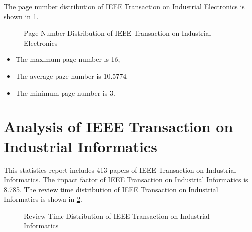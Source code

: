 \documentclass[12pt,
               a4paper,
               journal,
               onecolumn]{IEEEtran}
\begin{document}
The page number distribution of IEEE Transaction on Industrial Electronics is shown in \cref{fig:Page Number Distribution of IEEE Transaction on Industrial Electronics}.
\begin{figure}[htb]
  \centering
  \caption{Page Number Distribution of IEEE Transaction on Industrial Electronics}
  \label{fig:Page Number Distribution of IEEE Transaction on Industrial Electronics}
\end{figure}

\begin{itemize}
  \item The maximum page number is 16,
  \item The average page number is 10.5774,
  \item The minimum page number is 3.
\end{itemize}

\section{Analysis of IEEE Transaction on Industrial Informatics}
This statistics report includes 413 papers of IEEE Transaction on Industrial Informatics. The impact factor of IEEE Transaction on Industrial Informatics is 8.785. The review time distribution of IEEE Transaction on Industrial Informatics is shown in \cref{fig:Review Time Distribution of IEEE Transaction on Industrial Informatics}.
\begin{figure}[htb]
  \centering
  \caption{Review Time Distribution of IEEE Transaction on Industrial Informatics}
  \label{fig:Review Time Distribution of IEEE Transaction on Industrial Informatics}
\end{figure}
\end{document}
